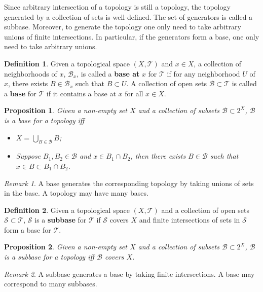 \documentclass[openany]{book}
\newtheorem{proposition}{Proposition}[chapter]
\theoremstyle{definition}
\newtheorem{definition}{Definition}[chapter]
\theoremstyle{remark}
\newtheorem*{remark}{Remark}
\begin{document}
Since arbitrary intersection of a topology is still a topology, the topology generated by a collection of sets is well-defined. The set of generators is called a subbase. Moreover, to generate the topology one only need to take arbitrary unions of finite intersections. In particular, if the generators form a base, one only need to take arbitrary unions.
\begin{definition}
    Given a topological space $(X,\mathcal{T})$ and $x\in X$, a collection of neighborhoods of $x$, $\mathcal{B}_x$, is called a \textbf{base at} $x$ for $\mathcal{T}$ if for any neighborhood $U$ of $x$, there exists $B\in \mathcal{B}_x$ such that $B\subset U$. A collection of open sets $\mathcal{B}\subset \mathcal{T}$ is called a \textbf{base} for $\mathcal{T}$ if it contains a base at $x$ for all $x\in X$.
\end{definition}
\begin{proposition}
    Given a non-empty set $X$ and a collection of subsets $\mathcal{B}\subset2^X$, $\mathcal{B}$ is a base for a topology iff
    \begin{itemize}
        \item $X=\bigcup_{B\in \mathcal{B}}B$;
        \item Suppose $B_1,B_2\in \mathcal{B}$ and $x\in B_1\cap B_2$, then there exists $B\in \mathcal{B}$ such that $x\in B\subset B_1\cap B_2$.
    \end{itemize}
\end{proposition}
\begin{remark}
    A base generates the corresponding topology by taking unions of sets in the base. A topology may have many bases.
\end{remark}
\begin{definition}
    Given a topological space $(X,\mathcal{T})$ and a collection of open sets $\mathcal{S}\subset \mathcal{T}$, $\mathcal{S}$ is a \textbf{subbase} for $\mathcal{T}$ if $\mathcal{S}$ covers $X$ and finite intersections of sets in $\mathcal{S}$ form a base for $\mathcal{T}$.
\end{definition}
\begin{proposition}
    Given a non-empty set $X$ and a collection of subsets $\mathcal{B}\subset2^X$, $\mathcal{B}$ is a subbase for a topology iff $\mathcal{B}$ covers $X$.
\end{proposition}
\begin{remark}
    A subbase generates a base by taking finite intersections. A base may correspond to many subbases.
\end{remark}
\end{document}
